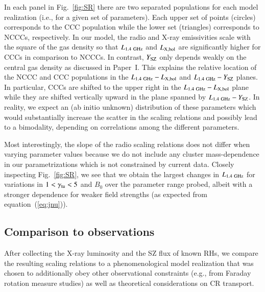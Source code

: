 \documentclass[useAMS,usenatbib]{mn2e}
\begin{document}
In each panel in Fig.~\ref{fig:SR} there are two separated populations for
each model realization (i.e., for a given set of parameters). Each upper set of
points (circles) corresponds to the CCC population while the lower set (triangles) 
corresponds to NCCCs, respectively. In our model, the radio and X-ray emissivities scale 
with the square of the gas density so that $L_{1.4~{\mathrm{GHz}}}$ and $L_{{\mathrm{X,bol}}}$
are significantly higher for CCCs in comparison to NCCCs. In contrast,
$Y_{{\mathrm{SZ}}}$ only depends weakly on the central gas density as discussed in
Paper~I. This explains the relative location of the NCCC and
CCC populations in the $L_{1.4~{\mathrm{GHz}}}-L_{{\mathrm{X,bol}}}$ and
$L_{1.4~{\mathrm{GHz}}}-Y_{{\mathrm{SZ}}}$ planes. In particular, CCCs are shifted to the
upper right in the $L_{1.4~{\mathrm{GHz}}}-L_{{\mathrm{X,bol}}}$ plane while they are
shifted vertically upward in the plane spanned by
$L_{1.4~{\mathrm{GHz}}}-Y_{{\mathrm{SZ}}}$. In reality, we expect an (ab initio unknown)
distribution of these parameters which would substantially increase the scatter
in the scaling relations and possibly lead to a bimodality, depending on
correlations among the different parameters.

Most interestingly, the slope of the radio scaling relations does not differ
when varying parameter values because we do not include any cluster
mass-dependence in our parametrizations which is not
constrained by current data. Closely inspecting Fig.~\ref{fig:SR}, we see that
we obtain the largest changes in $L_{1.4~{\mathrm{GHz}}}$ for variations in
$1<\gamma_{{\mathrm{tu}}}<5$ and $B_0$ over the parameter range probed, albeit with a
stronger dependence for weaker field strengths (as expected from
equation~(\ref{eq:jnu})).


\subsection{Comparison to observations}
\label{sec:scaling-obs}
 
After collecting the X-ray luminosity and the SZ flux of known RHs, we compare
the resulting scaling relations to a phenomenological model realization that was
chosen to additionally obey other observational constraints (e.g., from Faraday
rotation measure studies) as well as theoretical considerations on CR transport.
\end{document}
